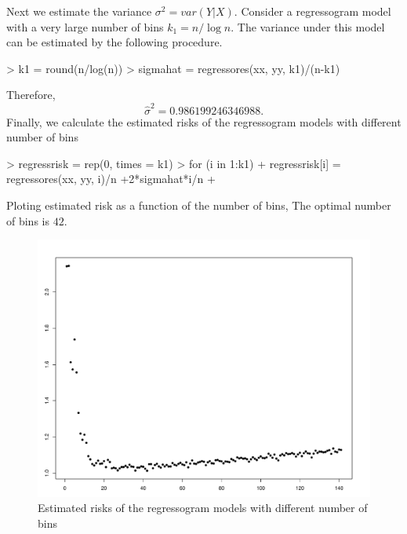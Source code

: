 \documentclass[12pt]{article}
\begin{document}
\begin{Schunk}
\end{Schunk}
Next we estimate the variance $\sigma^2=var(Y|X)$. Consider a regressogram model with a very large number of bins $k_1=n/\log n$. The variance under this model can be estimated by the following procedure.
\begin{Schunk}
\begin{Sinput}
> k1 = round(n/log(n))
> sigmahat = regressores(xx, yy, k1)/(n-k1)
\end{Sinput}
\end{Schunk}
Therefore,
\[
\widehat\sigma^2 = 0.986199246346988.
\]
Finally, we calculate the estimated risks of the regressogram models with different number of bins
\begin{Schunk}
\begin{Sinput}
> regressrisk = rep(0, times = k1)
> for (i in 1:k1){
+   regressrisk[i] = regressores(xx, yy, i)/n +2*sigmahat*i/n
+ }
\end{Sinput}
\end{Schunk}
Ploting estimated risk as a function of the number of bins, 
The optimal number of bins is $42$.
\begin{figure}
\begin{center}
\caption{Estimated risks of the regressogram models with different number of bins}
\includegraphics[scale=0.50]{figure1}
\end{center}
\end{figure}
\end{document}
